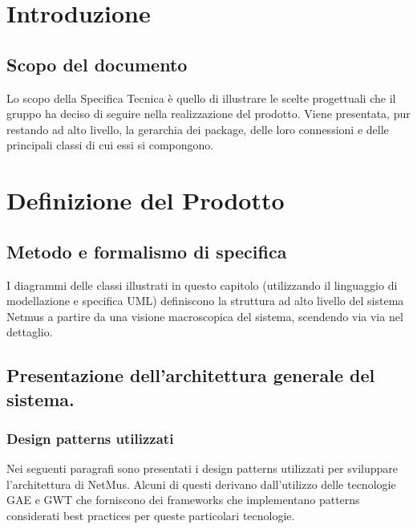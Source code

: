 \thispagestyle{fancy} %

\chapter{Introduzione}
\thispagestyle{fancy} %

\section{Scopo del documento}
Lo scopo della Specifica Tecnica \`e quello di illustrare le scelte progettuali
che il gruppo ha deciso di seguire nella realizzazione del prodotto. Viene
presentata, pur restando ad alto livello, la gerarchia dei package, delle loro
connessioni e delle principali classi di cui essi si compongono.



\chapter{Definizione del Prodotto}
\section{Metodo e formalismo di specifica}
I diagrammi delle classi illustrati in questo capitolo (utilizzando il
linguaggio di modellazione e specifica UML) definiscono la struttura ad alto
livello del sistema Netmus a partire da una visione macroscopica del sistema,
scendendo via via nel dettaglio.

\section{Presentazione dell'architettura generale del sistema.}

\subsection{Design patterns utilizzati}
Nei seguenti paragrafi sono presentati i design patterns utilizzati per
sviluppare l'architettura di NetMus. Alcuni di questi derivano dall'utilizzo
delle tecnologie GAE e GWT che forniscono dei frameworks che implementano
patterns considerati best practices per queste particolari tecnologie.

